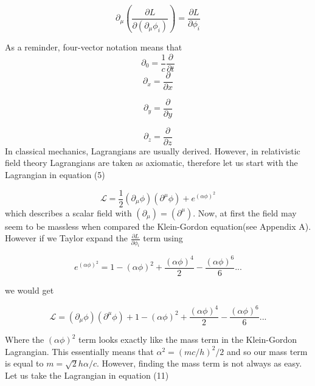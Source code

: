 \documentclass[12pt]{article}
\begin{document}
\begin{equation}
\partial_\mu{( \frac{\partial{L}}{\partial(\partial_\mu\phi_i)})}=\frac{\partial{L}}{\partial{\phi_i}}
\end{equation}
	
As a reminder, four-vector notation means that 
\begin{equation}
	\partial_0=\frac{1}{c}\frac{\partial}{\partial{t}}
\end{equation}
\begin{equation}
\partial_x=\frac{\partial}{\partial{x}}
\end{equation}	

\begin{equation}
\partial_y=\frac{\partial}{\partial{y}}
\end{equation}	

\begin{equation}
\partial_z=\frac{\partial}{\partial{z}}
\end{equation}	
In classical mechanics, Lagrangians are usually derived. However, in relativistic field theory Lagrangians are taken as axiomatic, therefore let us start with the Lagrangian in equation (5)

\begin{equation}
\mathcal{L}=\frac{1}{2}(\partial_\mu\phi)(\partial^\mu\phi)+e^{(\alpha\phi)^2}
\end{equation}
which describes a scalar field with $(\partial_\mu)=(\partial^\mu)$. Now, at first the field may seem to be massless when compared the Klein-Gordon equation(see Appendix A). However if we Taylor expand the  $\frac{\partial{L}}{\partial{\phi_i}}$ term using 

\begin{equation}
	e^{(\alpha\phi)^2}=1-(\alpha\phi)^2+\frac{(\alpha\phi)^4}{2}-\frac{(\alpha\phi)^6}{6}...
\end{equation}

we would get

\begin{equation}
\mathcal{L}=(\partial_\mu\phi)(\partial^\mu\phi)+1-(\alpha\phi)^2+\frac{(\alpha\phi)^4}{2}-\frac{(\alpha\phi)^6}{6}...
\end{equation}

Where the $(\alpha\phi)^2$ term looks exactly like the mass term in the Klein-Gordon Lagrangian. This essentially means that $ \alpha^2 = (mc/h)^2/2$ and so our mass term is equal to $m=\surd{2}h\alpha/c$. However, finding the mass term is not always as easy. Let us take the Lagrangian in equation (11)
\end{document}
